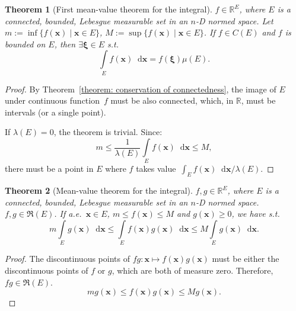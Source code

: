 \documentclass[openany]{book}
\theoremstyle{plain}
\newtheorem{theorem}{Theorem}[section] %
\theoremstyle{definition}
\newcommand{\dif}{\mathop{}\!\mathrm{d}} %
\newcommand*{\bv}{\boldsymbol} %
\begin{document}
\begin{theorem}[First mean-value theorem for the integral]
	\label{theorem: first mean-value theorem for the integral}
	$f \in \mathbb R^E$, where $E$ is a connected, bounded, Lebesgue measurable set in an $n$-D normed space. 
	Let $m := \inf\{f(\bv x) \mid \bv x \in E\}$, $M := \sup\{f(\bv x) \mid \bv x \in E\}$.
	If $f \in C(E)$ and $f$ is bounded on $E$, then $\exists \bv \xi \in E$ s.t.\ 
	\begin{equation*}
		\int\limits_E f(\bv x) \dif \bv x = f(\bv \xi) \mu(E).
	\end{equation*}
\end{theorem}
\begin{proof}
	By Theorem~\ref{theorem: conservation of connectedness}, the image of $E$ under continuous function~$f$ must be also connected, which, in $\mathbb R$, must be intervals (or a single point).

	If $\lambda(E) = 0$, the theorem is trivial. 
	Since:
	\begin{equation*}
		m \leq \frac{1}{\lambda (E)} \int\limits_E f(\bv x) \dif \bv x \leq M, 
	\end{equation*}
	there must be a point in $E$ where $f$ takes value~$\int_E f(\bv x) \dif \bv x / \lambda(E)$.
\end{proof}

\begin{theorem}[Mean-value theorem for the integral]
	\label{theorem: mean-value theorem for the integral}
	$f, g \in \mathbb R^E$, where $E$ is a connected, bounded, Lebesgue measurable set in an $n$-D normed space. 
	$f, g \in \mathfrak R(E)$. 
	If a.e.\ $\bv x \in E$, $m \leq f(\bv x) \leq M$ and $g(\bv x) \geq 0$, we have
	s.t.\ 
	\begin{equation*}
		m \int\limits_E g(\bv x) \dif \bv x 
			\leq \int\limits_E f(\bv x) g(\bv x)\dif \bv x 
			\leq M \int\limits_E g(\bv x) \dif \bv x.
	\end{equation*}
\end{theorem}
\begin{proof}
	The discontinuous points of $fg \colon \bv x \mapsto f(\bv x)g(\bv x)$ must be either the discontinuous points of $f$ or $g$, which are both of measure zero. Therefore, $fg \in \mathfrak R(E)$.
	\begin{equation*}
		m g(\bv x) \leq f(\bv x) g(\bv x) \leq M g(\bv x).
	\end{equation*}
\end{proof}
\end{document}
